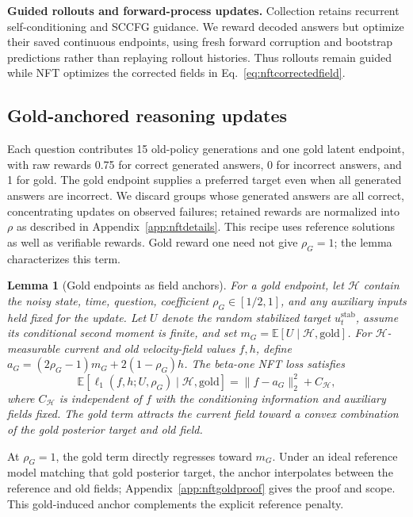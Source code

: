 \documentclass{article}
\newcommand{\E}{\mathbb{E}}
\newcommand{\rev}[1]{{\color{blue}#1}}
\newtheorem{lemma}{Lemma}
\begin{document}
\textbf{Guided rollouts and forward-process updates.}
Collection retains recurrent self-conditioning and SCCFG guidance. We reward decoded answers but optimize their saved continuous endpoints, using fresh forward corruption and bootstrap predictions rather than replaying rollout histories. Thus rollouts remain guided while NFT optimizes the corrected fields in Eq.~\eqref{eq:nftcorrectedfield}.

\subsection{Gold-anchored reasoning updates}
\label{sec:nftgold}

Each question contributes 15 old-policy generations and one gold latent endpoint, with raw rewards 0.75 for correct generated answers, 0 for incorrect answers, and 1 for gold. The gold endpoint supplies a preferred target even when all generated answers are incorrect. We discard groups whose generated answers are all correct, concentrating updates on observed failures; retained rewards are normalized into $\rho$ as described in Appendix~\ref{app:nftdetails}. This recipe uses reference solutions as well as verifiable rewards. \rev{Gold reward one need not give $\rho_G=1$; the lemma characterizes this term.}

\begin{lemma}[Gold endpoints as field anchors]
\label{lem:goldanchor}
For a gold endpoint, let $\mathcal H$ contain the noisy state, time, question, coefficient $\rho_G\in[1/2,1]$, and any auxiliary inputs held fixed for the update. Let $U$ denote the random stabilized target $u_t^{\mathrm{stab}}$, assume its conditional second moment is finite, and set $m_G=\E[U\mid\mathcal H,\mathrm{gold}]$. For $\mathcal H$-measurable current and old velocity-field values $f,h$, define $a_G=(2\rho_G-1)m_G+2(1-\rho_G)h$. The beta-one NFT loss satisfies
\begin{equation}
 \E[\ell_1(f,h;U,\rho_G)\mid\mathcal H,\mathrm{gold}]
 =\|f-a_G\|_2^2+C_{\mathcal H},
\label{eq:nftgoldanchor}
\end{equation}
where $C_{\mathcal H}$ is independent of $f$ with the conditioning information and auxiliary fields fixed. \rev{The gold term attracts the current field toward a convex combination of the gold posterior target and old field.}
\end{lemma}

At $\rho_G=1$, the gold term directly regresses toward $m_G$. Under an ideal reference model matching that gold posterior target, the anchor interpolates between the reference and old fields; Appendix~\ref{app:nftgoldproof} gives the proof and scope. This gold-induced anchor complements the explicit reference penalty.
\end{document}
